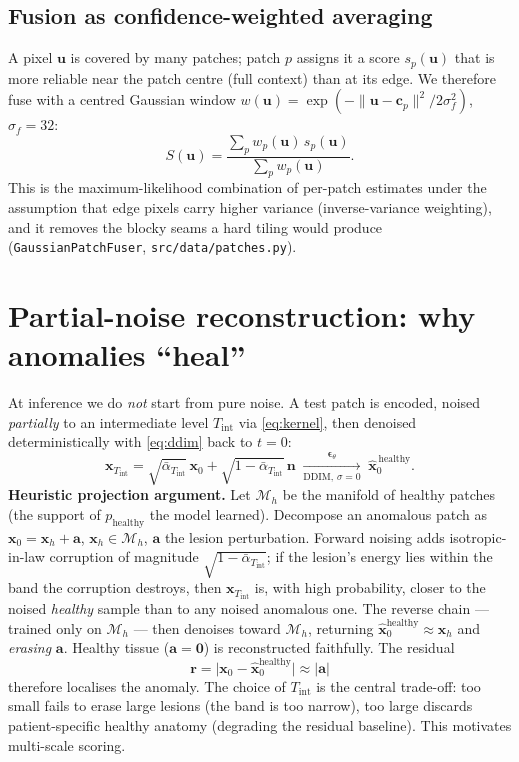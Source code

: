 \documentclass[12pt,a4paper]{article}
\newcommand{\x}{\bm{x}}
\newcommand{\eps}{\bm{\epsilon}}
\newcommand{\abar}{\bar{\alpha}}
\begin{document}
\subsection{Fusion as confidence-weighted averaging}
A pixel $\bm u$ is covered by many patches; patch $p$ assigns it a score
$s_p(\bm u)$ that is more reliable near the patch centre (full context) than at
its edge. We therefore fuse with a centred Gaussian window
$w(\bm u)=\exp(-\|\bm u-\bm c_p\|^2/2\sigma_f^2)$, $\sigma_f=32$:
\begin{equation}
S(\bm u)=\frac{\sum_{p}w_p(\bm u)\,s_p(\bm u)}{\sum_{p}w_p(\bm u)}.
\label{eq:fusion}
\end{equation}
This is the maximum-likelihood combination of per-patch estimates under the
assumption that edge pixels carry higher variance (inverse-variance weighting),
and it removes the blocky seams a hard tiling would produce
(\texttt{GaussianPatchFuser}, \texttt{src/data/patches.py}).

\section{Partial-noise reconstruction: why anomalies ``heal''}
\label{sec:partial}
At inference we do \emph{not} start from pure noise. A test patch is encoded,
noised \emph{partially} to an intermediate level $T_{\text{int}}$ via
\eqref{eq:kernel}, then denoised deterministically with \eqref{eq:ddim} back to
$t=0$:
\begin{equation}
\x_{T_{\text{int}}}=\sqrt{\abar_{T_{\text{int}}}}\,\x_0+\sqrt{1-\abar_{T_{\text{int}}}}\,\bm n
\;\xrightarrow[\text{DDIM},\,\sigma=0]{\;\eps_\theta\;}\;\hat{\x}_0^{\,\text{healthy}}.
\end{equation}
\textbf{Heuristic projection argument.} Let $\mathcal M_h$ be the manifold of
healthy patches (the support of $p_{\text{healthy}}$ the model learned). Decompose
an anomalous patch as $\x_0=\x_h+\bm a$, $\x_h\in\mathcal M_h$, $\bm a$ the lesion
perturbation. Forward noising adds isotropic-in-law corruption of magnitude
$\sqrt{1-\abar_{T_{\text{int}}}}$; if the lesion's energy lies within the band the
corruption destroys, then $\x_{T_{\text{int}}}$ is, with high probability, closer to
the noised \emph{healthy} sample than to any noised anomalous one. The reverse
chain --- trained only on $\mathcal M_h$ --- then denoises toward $\mathcal M_h$,
returning $\hat{\x}_0^{\text{healthy}}\approx\x_h$ and \emph{erasing} $\bm a$.
Healthy tissue ($\bm a=\bm 0$) is reconstructed faithfully. The residual
\begin{equation}
\bm r=\big|\x_0-\hat{\x}_0^{\text{healthy}}\big|\approx|\bm a|
\end{equation}
therefore localises the anomaly. The choice of $T_{\text{int}}$ is the central
trade-off: too small fails to erase large lesions (the band is too narrow), too
large discards patient-specific healthy anatomy (degrading the residual
baseline). This motivates multi-scale scoring.
\end{document}
